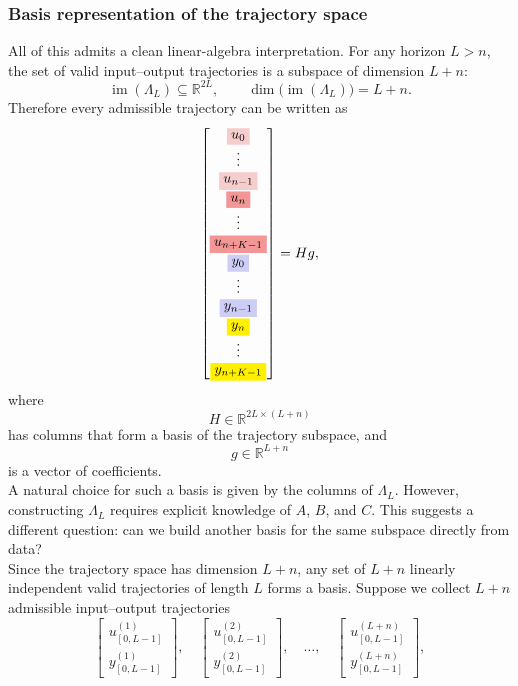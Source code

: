 \subsubsection{Basis representation of the trajectory space}
All of this admits a clean linear-algebra interpretation. For any horizon $L>n$, the set of valid input--output trajectories is a subspace of dimension $L+n$:
\[
\operatorname{im}(\Lambda_L)\subseteq \mathbb{R}^{2L},
\qquad
\dim\bigl(\operatorname{im}(\Lambda_L)\bigr)=L+n.
\]
Therefore every admissible trajectory can be written as
\[
\begin{bmatrix}
\colorbox{lightred}{$\displaystyle u_0$}\\
\vdots\\
\colorbox{lightred}{$\displaystyle u_{n-1}$}\\
\colorbox{midred}{$\displaystyle u_n$}\\
\vdots\\
\colorbox{midred}{$\displaystyle u_{n+K-1}$}\\
\colorbox{lightblue}{$\displaystyle y_0$}\\
\vdots\\
\colorbox{lightblue}{$\displaystyle y_{n-1}$}\\
\colorbox{yellowblock}{$\displaystyle y_n$}\\
\vdots\\
\colorbox{yellowblock}{$\displaystyle y_{n+K-1}$}
\end{bmatrix}
=Hg,
\]
where
\[
H\in\mathbb{R}^{2L\times(L+n)}
\]
has columns that form a basis of the trajectory subspace, and
\[
g\in\mathbb{R}^{L+n}
\]
is a vector of coefficients.\\
A natural choice for such a basis is given by the columns of $\Lambda_L$. However, constructing $\Lambda_L$ requires explicit knowledge of $A$, $B$, and $C$. This suggests a different question: can we build another basis for the same subspace directly from data?\\
Since the trajectory space has dimension $L+n$, any set of $L+n$ linearly independent valid trajectories of length $L$ forms a basis. Suppose we collect $L+n$ admissible input--output trajectories
\[
\begin{bmatrix}
u^{(1)}_{[0,L-1]}\\[1mm]
y^{(1)}_{[0,L-1]}
\end{bmatrix},
\quad
\begin{bmatrix}
u^{(2)}_{[0,L-1]}\\[1mm]
y^{(2)}_{[0,L-1]}
\end{bmatrix},
\quad \dots,\quad
\begin{bmatrix}
u^{(L+n)}_{[0,L-1]}\\[1mm]
y^{(L+n)}_{[0,L-1]}
\end{bmatrix},
\]
